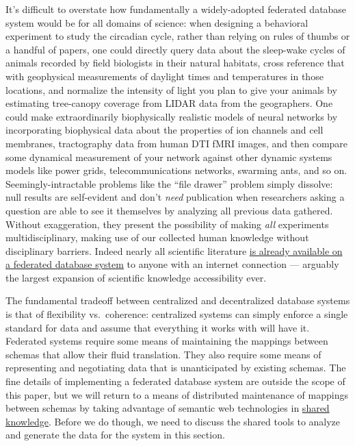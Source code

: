 \documentclass[nohyper]{tufte-book-jls}
\begin{document}
It's difficult to overstate how fundamentally a widely-adopted federated
database system would be for all domains of science: when designing a
behavioral experiment to study the circadian cycle, rather than relying
on rules of thumbs or a handful of papers, one could directly query data
about the sleep-wake cycles of animals recorded by field biologists in
their natural habitats, cross reference that with geophysical
measurements of daylight times and temperatures in those locations, and
normalize the intensity of light you plan to give your animals by
estimating tree-canopy coverage from LIDAR data from the geographers.
One could make extraordinarily biophysically realistic models of neural
networks by incorporating biophysical data about the properties of ion
channels and cell membranes, tractography data from human DTI fMRI
images, and then compare some dynamical measurement of your network
against other dynamic systems models like power grids,
telecommunications networks, swarming ants, and so on.
Seemingly-intractable problems like the ``file drawer'' problem simply
dissolve: null results are self-evident and don't \emph{need}
publication when researchers asking a question are able to see it
themselves by analyzing all previous data gathered. Without
exaggeration, they present the possibility of making \emph{all}
experiments multidisciplinary, making use of our collected human
knowledge without disciplinary barriers. Indeed nearly all scientific
literature \href{https://freeread.org/ipfs/}{is already available on a
federated database system} to anyone with an internet connection ---
arguably the largest expansion of scientific knowledge accessibility
ever.

The fundamental tradeoff between centralized and decentralized database
systems is that of flexibility vs.~coherence: centralized systems can
simply enforce a single standard for data and assume that everything it
works with will have it. Federated systems require some means of
maintaining the mappings between schemas that allow their fluid
translation. They also require some means of representing and
negotiating data that is unanticipated by existing schemas. The fine
details of implementing a federated database system are outside the
scope of this paper, but we will return to a means of distributed
maintenance of mappings between schemas by taking advantage of semantic
web technologies in \protect\hyperlink{shared-knowledge}{shared
knowledge}. Before we do though, we need to discuss the shared tools to
analyze and generate the data for the system in this section.
\end{document}
